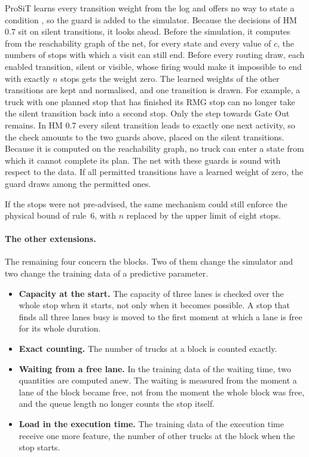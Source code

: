 ProSiT learns every transition weight from the log and offers no way to state a
condition \cite{Vinci2026prosit,ProSiTRepository}, so the guard is added to the
simulator. Because the decisions of HM 0.7 sit on silent transitions, it looks
ahead. Before the simulation, it computes from the reachability graph of the net, for
every state and every value of $c$, the numbers of stops with which a visit can
still end. Before every routing draw, each enabled transition, silent or visible,
whose firing would make it impossible to end with exactly $n$ stops gets the
weight zero. The learned weights of the other transitions are kept and normalised,
and one transition is drawn. For example, a truck with one planned stop that has
finished its RMG stop can no longer take the silent transition back into a second
stop. Only the step towards Gate Out remains. In HM 0.7 every silent transition
leads to exactly one next activity, so the check amounts to the two guards above,
placed on the silent transitions. Because it is computed on the reachability graph,
no truck can enter a state from which it cannot complete its plan. The net with
these guards is sound with respect to the data. If all permitted transitions have a
learned weight of zero, the guard draws among the permitted ones.

If the stops were not pre-advised, the same mechanism could still enforce the
physical bound of rule~6, with $n$ replaced by the upper limit of eight stops.

\paragraph{The other extensions.} The remaining four concern the blocks. Two of them
change the simulator and two change the training data of a predictive parameter.
\begin{itemize}[itemsep=2pt,topsep=4pt]
\item \textbf{Capacity at the start.} The capacity of three lanes is checked over
the whole stop when it starts, not only when it becomes possible. A stop that
finds all three lanes busy is moved to the first moment at which a lane is free for
its whole duration.
\item \textbf{Exact counting.} The number of trucks at a block is counted exactly.
\item \textbf{Waiting from a free lane.} In the training data of the waiting time,
two quantities are computed anew. The waiting is measured from the moment a lane of
the block became free, not from the moment the whole block was free, and the queue
length no longer counts the stop itself.
\item \textbf{Load in the execution time.} The training data of the execution time
receive one more feature, the number of other trucks at the block when the stop
starts.
\end{itemize}

